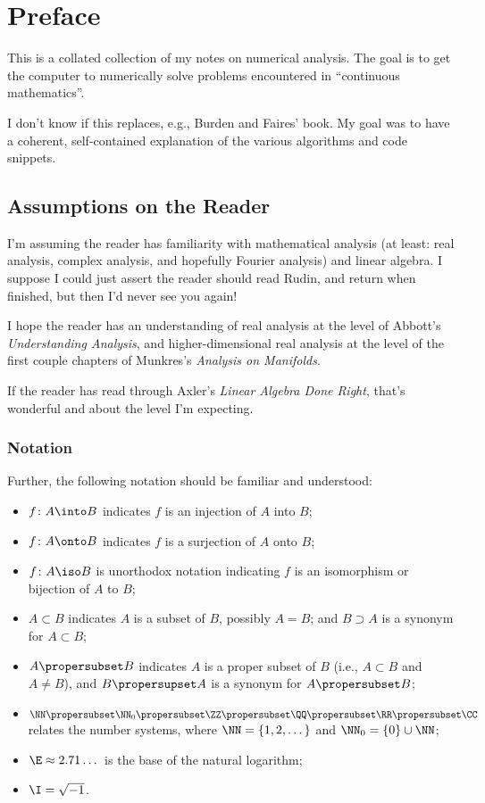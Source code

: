 \chapter{Preface}

This is a collated collection of my notes on numerical analysis. 
The goal is to get the computer to numerically solve problems
encountered in ``continuous mathematics''.

I don't know if this replaces, e.g., Burden and Faires' book. My goal
was to have a coherent, self-contained explanation of the various
algorithms and code snippets.

\section*{Assumptions on the Reader}

I'm assuming the reader has familiarity with mathematical analysis (at
least: real analysis, complex analysis, and hopefully Fourier analysis)
and linear algebra. I suppose I could just assert the reader should read
Rudin, and return when finished, but then I'd never see you again!

I hope the reader has an understanding of real analysis at the level of
Abbott's \emph{Understanding Analysis}, and higher-dimensional real
analysis at the level of the first couple chapters of Munkres's
\emph{Analysis on Manifolds}.

If the reader has read through Axler's \emph{Linear Algebra Done Right},
that's wonderful and about the level I'm expecting.

\subsection*{Notation}

Further, the following notation should be familiar and understood:

\begin{itemize}
\item $f\colon A\into B$ indicates $f$ is an injection of $A$ into $B$;
\item $f\colon A\onto B$ indicates $f$ is a surjection of $A$ onto $B$;
\item $f\colon A\iso B$ is unorthodox notation indicating $f$ is an
  isomorphism or bijection of $A$ to $B$;
\item $A\subset B$ indicates $A$ is a subset of $B$, possibly $A=B$;
  and $B\supset A$ is a synonym for $A\subset B$;
\item $A\propersubset B$ indicates $A$ is a proper subset of $B$ (i.e.,
  $A\subset B$ and $A\neq B$), and $B\propersupset A$ is a synonym for
  $A\propersubset B$;
\item $\NN\propersubset\NN_{0}\propersubset\ZZ\propersubset\QQ\propersubset\RR\propersubset\CC$
  relates the number systems, where $\NN = \{1,2,\dots\}$ and $\NN_{0}=\{0\}\cup\NN$;
\item $\E\approx 2.71\dots$ is the base of the natural logarithm;
\item $\I=\sqrt{-1}$.
\end{itemize}

